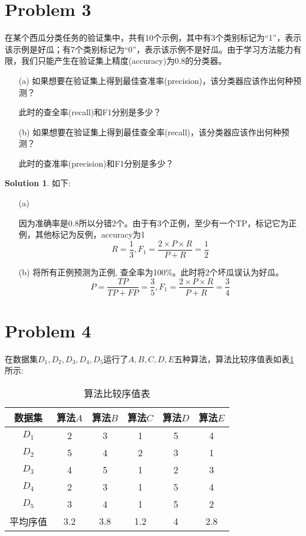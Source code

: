 \documentclass[a4paper,UTF8]{article}
\theoremstyle{definition}
\newtheorem*{solution}{Solution}
\begin{document}
\section*{Problem 3} 
在某个西瓜分类任务的验证集中，共有10个示例，其中有3个类别标记为“1”，表示该示例是好瓜；有7个类别标记为“0”，表示该示例不是好瓜。由于学习方法能力有限，我们只能产生在验证集上精度(accuracy)为0.8的分类器。
\begin{itemize}
\item[(a)] 如果想要在验证集上得到最佳查准率(precision)，该分类器应该作出何种预测？

此时的查全率(recall)和F1分别是多少？
\item[(b)] 如果想要在验证集上得到最佳查全率(recall)，该分类器应该作出何种预测？

此时的查准率(precision)和F1分别是多少？
\end{itemize}
\begin{solution}
如下:
\begin{itemize}
\item[(a)] {因为准确率是0.8所以分错2个。由于有3个正例，至少有一个TP，标记它为正例，其他标记为反例，accuracy为1
$$ R =\frac{1}{3}, F_1 = \frac{2 \times P\times R }{P+R} = \frac{1}{2} $$ 

 }
\item[(b)] {将所有正例预测为正例, 查全率为100\%。此时将2个坏瓜误认为好瓜。\\

$$ P = \frac{TP}{TP+FP} = \frac{3}{5}, F_1 = \frac{2 \times P\times R }{P+R} = \frac{3}{4} $$ 
}
\end{itemize}

\end{solution}

\section*{Problem 4} 
在数据集$D_1,D_2,D_3,D_4,D_5$运行了$A,B,C,D,E$五种算法，算法比较序值表如表\ref{table:ranking}所示:
\begin{table}[h]
\centering
\caption{算法比较序值表} \vspace{2mm}\label{table:ranking}
\begin{tabular}{c|c c c c c}\hline
数据集 & 算法$A$ & 算法$B$  & 算法$C$  &算法$D$  &算法$E$ \\
\hline
$D_1$ & 2  & 3 &  1 &  5  & 4\\
$D_2$ & 5  & 4 &  2 &  3  & 1\\
$D_3$ & 4  & 5 &  1 &  2  & 3\\
$D_4$ & 2  & 3 &  1 &  5  & 4\\
$D_5$ & 3  & 4 &  1 &  5  & 2\\
\hline
平均序值 & 3.2 &  3.8 & 1.2 &  4 &  2.8 \\
\hline
\end{tabular}
\end{table}
\end{document}

